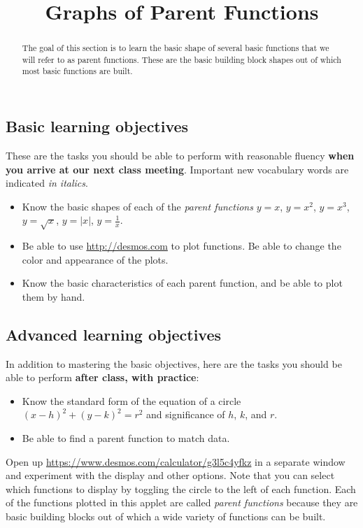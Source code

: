 \documentclass[numbers]{ximera}
\title{Graphs of Parent Functions}
\begin{document}
\begin{abstract}
The goal of this section is to learn the basic shape of several basic functions that we will refer to as parent functions. These are the basic building block shapes out of which most basic functions are built.
\end{abstract}
\maketitle

\subsection*{Basic learning objectives}

These are the tasks you should be able to perform with reasonable fluency \textbf{when you arrive at our next class meeting}. Important new vocabulary words are indicated \emph{in italics}. 

\begin{itemize}
	\item Know the basic shapes of each of the \emph{parent functions} $y=x$, $y=x^2$, $y=x^3$, $y=\sqrt{x}$, $y=|x|$, $y=\frac{1}{x}$.
	\item Be able to use \url{http://desmos.com} to plot functions. Be able to change the color and appearance of the plots.
	\item Know the basic characteristics of each parent function, and be able to plot them by hand.
\end{itemize}

\subsection*{Advanced learning objectives}

In addition to mastering the basic objectives, here are the tasks you should be able to perform \textbf{after class, with practice}: 

\begin{itemize}
	\item Know the standard form of the equation of a circle $(x-h)^2+(y-k)^2=r^2$ and significance of $h$, $k$, and $r$.
	\item Be able to find a parent function to match data.
\end{itemize}

Open up \url{https://www.desmos.com/calculator/g3l5c4yfkz} in a separate window and experiment with the display and other options. Note that you can select which functions to display by toggling the circle to the left of each function. Each of the functions plotted in this applet are called \emph{parent functions} because they are basic building blocks out of which a wide variety of functions can be built.
\end{document}
